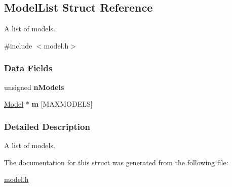 \hypertarget{struct_model_list}{\subsection{\-Model\-List \-Struct \-Reference}
\label{struct_model_list}
}


\-A list of models.  




{\ttfamily \#include $<$model.\-h$>$}

\subsubsection*{\-Data \-Fields}
\begin{DoxyCompactItemize}
\item 
\hypertarget{struct_model_list_a58301ab01d8eef6ac4d0a486f89fcc08}{unsigned {\bfseries n\-Models}}\label{struct_model_list_a58301ab01d8eef6ac4d0a486f89fcc08}

\item 
\hypertarget{struct_model_list_a05ff4f000fae734e434a27b4fe016c82}{\hyperlink{struct_model}{\-Model} $\ast$ {\bfseries m} \mbox{[}\-M\-A\-X\-M\-O\-D\-E\-L\-S\mbox{]}}\label{struct_model_list_a05ff4f000fae734e434a27b4fe016c82}

\end{DoxyCompactItemize}


\subsubsection{\-Detailed \-Description}
\-A list of models. 

\-The documentation for this struct was generated from the following file\-:\begin{DoxyCompactItemize}
\item 
\hyperlink{model_8h}{model.\-h}\end{DoxyCompactItemize}
